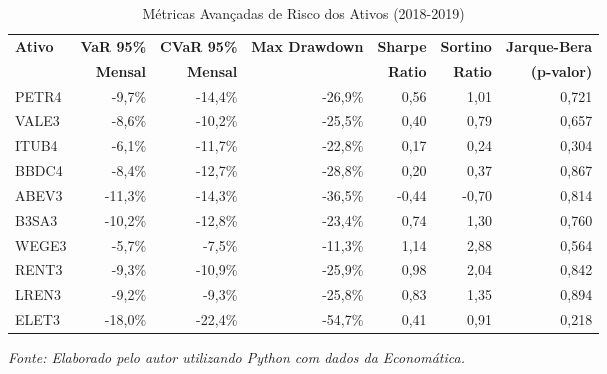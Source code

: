 \begin{table}[H]
\centering
\caption{Métricas Avançadas de Risco dos Ativos (2018-2019)}
\begin{tabular}{|l|r|r|r|r|r|r|}
\hline
\textbf{Ativo} & \textbf{VaR 95\%} & \textbf{CVaR 95\%} & \textbf{Max Drawdown} & \textbf{Sharpe} & \textbf{Sortino} & \textbf{Jarque-Bera} \\
& \textbf{Mensal} & \textbf{Mensal} & & \textbf{Ratio} & \textbf{Ratio} & \textbf{(p-valor)} \\
\hline
PETR4 & -9,7\% & -14,4\% & -26,9\% & 0,56 & 1,01 & 0,721 \\
\hline
VALE3 & -8,6\% & -10,2\% & -25,5\% & 0,40 & 0,79 & 0,657 \\
\hline
ITUB4 & -6,1\% & -11,7\% & -22,8\% & 0,17 & 0,24 & 0,304 \\
\hline
BBDC4 & -8,4\% & -12,7\% & -28,8\% & 0,20 & 0,37 & 0,867 \\
\hline
ABEV3 & -11,3\% & -14,3\% & -36,5\% & -0,44 & -0,70 & 0,814 \\
\hline
B3SA3 & -10,2\% & -12,8\% & -23,4\% & 0,74 & 1,30 & 0,760 \\
\hline
WEGE3 & -5,7\% & -7,5\% & -11,3\% & 1,14 & 2,88 & 0,564 \\
\hline
RENT3 & -9,3\% & -10,9\% & -25,9\% & 0,98 & 2,04 & 0,842 \\
\hline
LREN3 & -9,2\% & -9,3\% & -25,8\% & 0,83 & 1,35 & 0,894 \\
\hline
ELET3 & -18,0\% & -22,4\% & -54,7\% & 0,41 & 0,91 & 0,218 \\
\hline
\end{tabular}

\textit{Fonte: Elaborado pelo autor utilizando Python com dados da Economática.}
\label{tab:risk_metrics}
\end{table}
